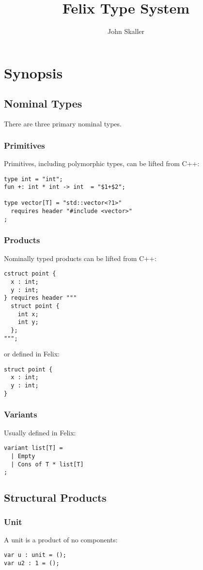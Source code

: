 \documentclass[oneside]{book}
\title{Felix Type System}
\author{John Skaller}
\begin{document}
\maketitle
\tableofcontents
\chapter{Synopsis}
\section{Nominal Types}
There are three primary nominal types.
\subsection{Primitives}
Primitives, including polymorphic types, can be lifted from C++:
\begin{verbatim}
type int = "int";
fun +: int * int -> int  = "$1+$2";

type vector[T] = "std::vector<?1>" 
  requires header "#include <vector>"
; 
\end{verbatim}

\subsection{Products}
Nominally typed products can be lifted from C++:
\begin{verbatim}
cstruct point {
  x : int;
  y : int;
} requires header """
  struct point {
    int x;
    int y;
  };
""";
\end{verbatim}
or defined in Felix:
\begin{verbatim}
struct point {
  x : int;
  y : int;
}
\end{verbatim}

\subsection{Variants}
Usually defined in Felix:
\begin{verbatim}
variant list[T] = 
  | Empty 
  | Cons of T * list[T]
;
\end{verbatim}

\section{Structural Products}
\subsection{Unit}
A unit is a product of no components:
\begin{verbatim}
var u : unit = ();
var u2 : 1 = ();
\end{verbatim}
\end{document}

